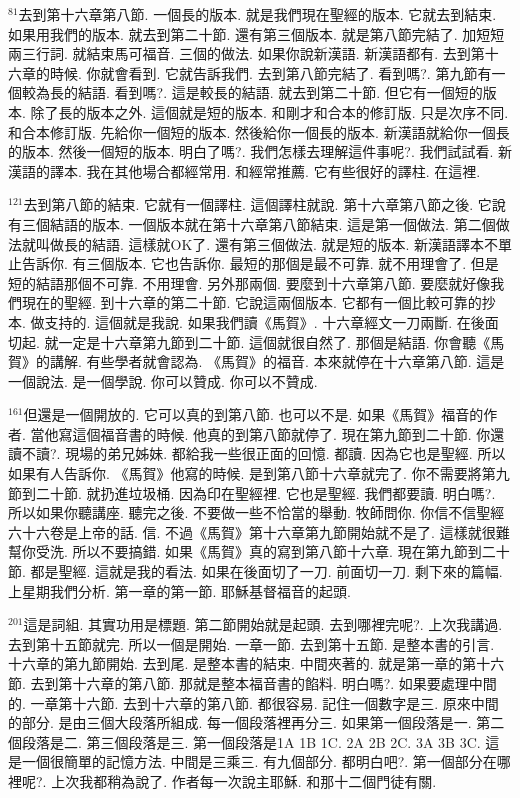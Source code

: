 \documentclass{book}
\begin{document}
$^{81}$去到第十六章第八節.
一個長的版本.
就是我們現在聖經的版本.
它就去到結束.
如果用我們的版本.
就去到第二十節.
還有第三個版本.
就是第八節完結了.
加短短兩三行詞.
就結束馬可福音.
三個的做法.
如果你說新漢語.
新漢語都有.
去到第十六章的時候.
你就會看到.
它就告訴我們.
去到第八節完結了.
看到嗎?.
第九節有一個較為長的結語.
看到嗎?.
這是較長的結語.
就去到第二十節.
但它有一個短的版本.
除了長的版本之外.
這個就是短的版本.
和剛才和合本的修訂版.
只是次序不同.
和合本修訂版.
先給你一個短的版本.
然後給你一個長的版本.
新漢語就給你一個長的版本.
然後一個短的版本.
明白了嗎?.
我們怎樣去理解這件事呢?.
我們試試看.
新漢語的譯本.
我在其他場合都經常用.
和經常推薦.
它有些很好的譯柱.
在這裡.

$^{121}$去到第八節的結束.
它就有一個譯柱.
這個譯柱就說.
第十六章第八節之後.
它說有三個結語的版本.
一個版本就在第十六章第八節結束.
這是第一個做法.
第二個做法就叫做長的結語.
這樣就OK了.
還有第三個做法.
就是短的版本.
新漢語譯本不單止告訴你.
有三個版本.
它也告訴你.
最短的那個是最不可靠.
就不用理會了.
但是短的結語那個不可靠.
不用理會.
另外那兩個.
要麼到十六章第八節.
要麼就好像我們現在的聖經.
到十六章的第二十節.
它說這兩個版本.
它都有一個比較可靠的抄本.
做支持的.
這個就是我說.
如果我們讀《馬賀》.
十六章經文一刀兩斷.
在後面切起.
就一定是十六章第九節到二十節.
這個就很自然了.
那個是結語.
你會聽《馬賀》的講解.
有些學者就會認為.
《馬賀》的福音.
本來就停在十六章第八節.
這是一個說法.
是一個學說.
你可以贊成.
你可以不贊成.

$^{161}$但還是一個開放的.
它可以真的到第八節.
也可以不是.
如果《馬賀》福音的作者.
當他寫這個福音書的時候.
他真的到第八節就停了.
現在第九節到二十節.
你還讀不讀?.
現場的弟兄姊妹.
都給我一些很正面的回憶.
都讀.
因為它也是聖經.
所以如果有人告訴你.
《馬賀》他寫的時候.
是到第八節十六章就完了.
你不需要將第九節到二十節.
就扔進垃圾桶.
因為印在聖經裡.
它也是聖經.
我們都要讀.
明白嗎?.
所以如果你聽講座.
聽完之後.
不要做一些不恰當的舉動.
牧師問你.
你信不信聖經六十六卷是上帝的話.
信.
不過《馬賀》第十六章第九節開始就不是了.
這樣就很難幫你受洗.
所以不要搞錯.
如果《馬賀》真的寫到第八節十六章.
現在第九節到二十節.
都是聖經.
這就是我的看法.
如果在後面切了一刀.
前面切一刀.
剩下來的篇幅.
上星期我們分析.
第一章的第一節.
耶穌基督福音的起頭.

$^{201}$這是詞組.
其實功用是標題.
第二節開始就是起頭.
去到哪裡完呢?.
上次我講過.
去到第十五節就完.
所以一個是開始.
一章一節.
去到第十五節.
是整本書的引言.
十六章的第九節開始.
去到尾.
是整本書的結束.
中間夾著的.
就是第一章的第十六節.
去到第十六章的第八節.
那就是整本福音書的餡料.
明白嗎?.
如果要處理中間的.
一章第十六節.
去到十六章的第八節.
都很容易.
記住一個數字是三.
原來中間的部分.
是由三個大段落所組成.
每一個段落裡再分三.
如果第一個段落是一.
第二個段落是二.
第三個段落是三.
第一個段落是1A 1B 1C.
2A 2B 2C.
3A 3B 3C.
這是一個很簡單的記憶方法.
中間是三乘三.
有九個部分.
都明白吧?.
第一個部分在哪裡呢?.
上次我都稍為說了.
作者每一次說主耶穌.
和那十二個門徒有關.
\end{document}
